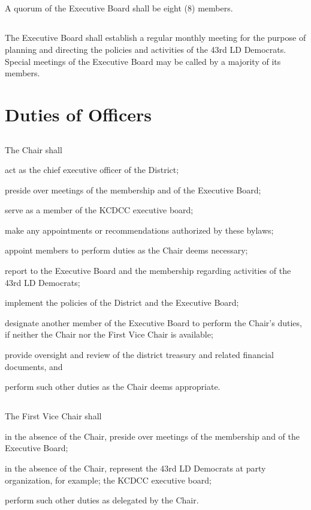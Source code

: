 \subsection{}
A quorum of the Executive Board shall be eight (8) members.

\subsection{}
The Executive Board shall establish a regular monthly meeting for the purpose of planning and directing the policies and activities of the 43rd LD Democrats. Special meetings of the Executive Board may be called by a majority of its members.

\section{Duties of Officers}
\subsection{}
The Chair shall
\begin{inlinealphalist}
    \item act as the chief executive officer of the \fortythird{} District;
    \item preside over meetings of the membership and of the Executive Board;
    \item serve as a member of the KCDCC executive board;
    \item make any appointments or recommendations authorized by these bylaws;
    \item appoint members to perform duties as the Chair deems necessary;
    \item report to the Executive Board and the membership regarding activities of the 43rd LD Democrats;
    \item implement the policies of the \fortythird{} District and the Executive Board;
    \item designate another member of the Executive Board to perform the Chair’s duties, if neither the Chair nor the First Vice Chair is available;
    \item provide oversight and review of the district treasury and related financial documents, and
    \item perform such other duties as the Chair deems appropriate.
\end{inlinealphalist}

\subsection{}
The First Vice Chair shall
\begin{inlinealphalist}
    \item in the absence of the Chair, preside over meetings of the membership and of the Executive Board;
    \item in the absence of the Chair, represent the 43rd LD Democrats at party organization, for example; the KCDCC executive board;
    \item perform such other duties as delegated by the Chair.
\end{inlinealphalist}

